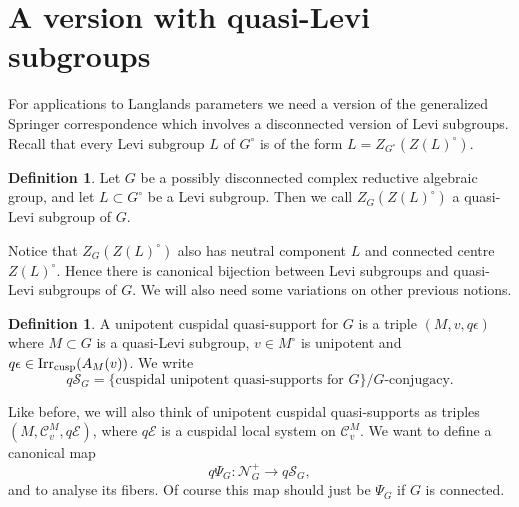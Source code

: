 \documentclass[11pt]{amsart}
\theoremstyle{definition}
\newtheorem{defn}[thm]{Definition}
\def\Irr{{\rm Irr}}
\def\cC{{\mathcal C}}
\def\cS{{\mathcal S}}
\def\cN{{\mathcal N}}
\def\cE{{\mathcal E}}
\def\cusp{{\rm cusp}}
\begin{document}
\section{A version with quasi-Levi subgroups}
\label{sec:quasiLevi}

For applications to Langlands parameters we need a version of the generalized
Springer correspondence which involves a disconnected version of Levi subgroups. 
Recall that every Levi subgroup $L$ of $G^\circ$ is of the form 
$L = Z_{G^\circ} (Z(L)^\circ)$.

\begin{defn}
Let $G$ be a possibly disconnected complex reductive algebraic group, and
let $L \subset G^\circ$ be a Levi subgroup. Then we call $Z_G (Z(L)^\circ)$
a quasi-Levi subgroup of $G$. 
\end{defn}

Notice that $Z_G (Z(L)^\circ)$ also has neutral component $L$ and connected
centre $Z(L)^\circ$. Hence there is canonical bijection between Levi subgroups 
and quasi-Levi subgroups of $G$.
We will also need some variations on other previous notions.

\begin{defn}
A unipotent cuspidal quasi-support for $G$ is a triple $(M,v,q \epsilon)$
where $M \subset G$ is a quasi-Levi subgroup, $v \in M^\circ$ is unipotent
and $q \epsilon \in \Irr_\cusp (A_M (v))$. We write
\[
q \cS_G = \{ \text{cuspidal unipotent quasi-supports for } G \} / 
G\text{-conjugacy} . 
\]
\end{defn}
Like before, we will also think of unipotent cuspidal quasi-supports as
triples $(M,\cC_v^M,q \cE)$, where $q \cE$ is a cuspidal local system on $\cC_v^M$.
We want to define a canonical map 
\[
q \Psi_G : \cN_G^+ \to q \cS_G ,
\]
and to analyse its fibers. Of course this map should just be $\Psi_G$ if $G$ is
connected. 
\end{document}
